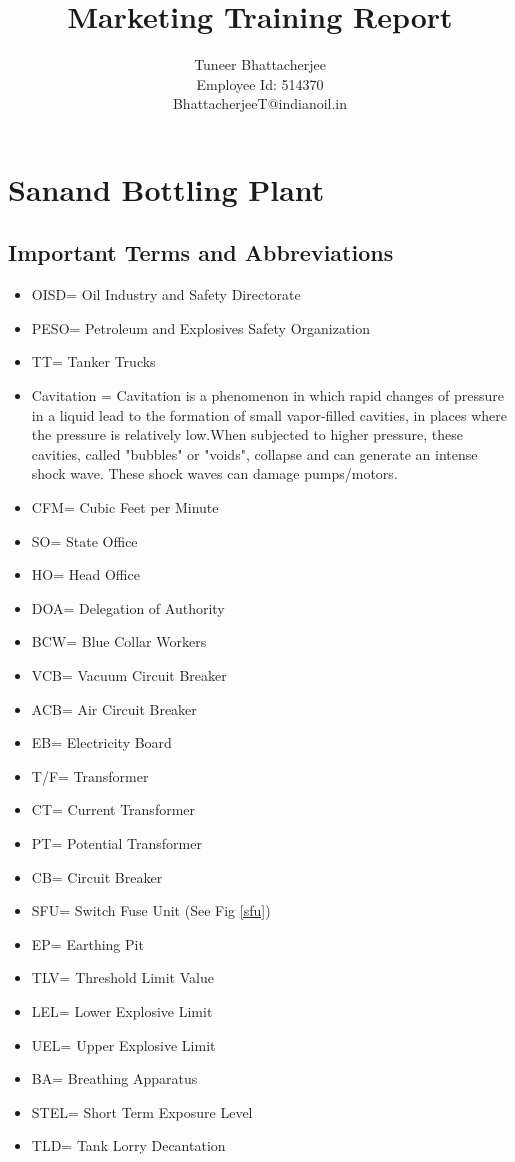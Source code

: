 \documentclass{report}
\title{Marketing Training Report}
\author{Tuneer Bhattacherjee\\Employee Id: 514370\\BhattacherjeeT@indianoil.in}
\date{}
\begin{document}
	\maketitle
	\pagebreak
	\tableofcontents
	\pagebreak
	\chapter{Sanand Bottling Plant}
	\section{Important Terms and Abbreviations}
	\begin{itemize}
		\item OISD= Oil Industry and Safety Directorate
		\item PESO= Petroleum and Explosives Safety Organization
		\item TT= Tanker Trucks
		\item Cavitation = Cavitation is a phenomenon in which rapid changes of pressure in a liquid lead to the formation of small vapor-filled cavities, in places where the pressure is relatively low.When subjected to higher pressure, these cavities, called "bubbles" or "voids", collapse and can generate an intense shock wave. These shock waves can damage pumps/motors.
		\item CFM= Cubic Feet per Minute
		\item SO= State Office
		\item HO= Head Office
		\item DOA= Delegation of Authority
		\item BCW= Blue Collar Workers
		\item VCB= Vacuum Circuit Breaker
		\item ACB= Air Circuit Breaker
		\item EB= Electricity Board
		\item T/F= Transformer
		\item CT= Current Transformer
		\item PT= Potential Transformer
		\item CB= Circuit Breaker
		\item SFU= Switch Fuse Unit (See Fig \ref{sfu})
		\item EP= Earthing Pit
		\item TLV= Threshold Limit Value
		\item LEL= Lower Explosive Limit
		\item UEL= Upper Explosive Limit
		\item BA= Breathing Apparatus
		\item STEL= Short Term Exposure Level
		\item TLD= Tank Lorry Decantation
	\end{itemize}
\end{document}
